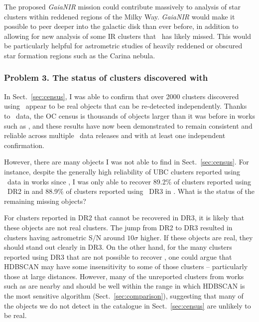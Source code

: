 The proposed \emph{GaiaNIR} mission \citep{hobbs_gaianir_combining_2016} could contribute massively to analysis of star clusters within reddened regions of the Milky Way. \emph{GaiaNIR} would make it possible to peer deeper into the galactic disk than ever before, in addition to allowing for new analysis of some IR clusters that \gaia\ has likely missed. This would be particularly helpful for astrometric studies of heavily reddened or obscured star formation regions such as the Carina nebula.


\subsubsection{Problem 3. The status of clusters discovered with \gaia}

In Sect.~\ref{sec:census}, I was able to confirm that over 2000 clusters discovered using \gaia\ appear to be real objects that can be re-detected independently. Thanks to \gaia\ data, the OC census is thousands of objects larger than it was before in works such as \cite{kharchenko_global_2013}, and these results have now been demonstrated to remain consistent and reliable across multiple \gaia\ data releases and with at least one independent confirmation.

However, there are many objects I was not able to find in Sect.~\ref{sec:census}. For instance, despite the generally high reliability of UBC clusters reported using \gaia\ data in works since \cite{castro-ginard_new_2018}, I was only able to recover 89.2\% of clusters reported using \gaia\ DR2 in \cite{castro-ginard_hunting_2020} and 88.9\% of clusters reported using \gaia\ DR3 in \cite{castro-ginard_hunting_2022}. What is the status of the remaining missing objects?

For clusters reported in DR2 that cannot be recovered in DR3, it is likely that these objects are not real clusters. The jump from DR2 to DR3 resulted in clusters having astrometric S/N around $10\sigma$ higher. If these objects are real, they should stand out clearly in DR3. On the other hand, for the many clusters reported using DR3 that are not possible to recover \citep[e.g. 55.5\% of][]{he_unveiling_hidden_2022}, one could argue that HDBSCAN may have some insensitivity to some of those clusters -- particularly those at large distances. However, many of the unreported clusters from works such as \cite{he_unveiling_hidden_2022} are nearby and should be well within the range in which HDBSCAN is the most sensitive algorithm (Sect.~\ref{sec:comparison}), suggesting that many of the objects we do not detect in the catalogue in Sect.~\ref{sec:census} are unlikely to be real.


